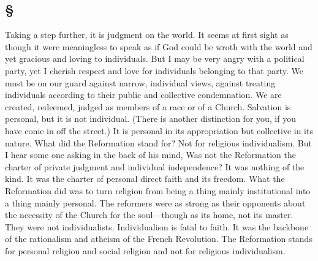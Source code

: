 \documentclass[draft]{ptfdoc}
\begin{document}
\subsection*{
\S
}

Taking a step further, it is judgment on the 
world. It seems at first sight as though it 
were meaningless to speak as if God could be 
wroth with the world and yet gracious and 
loving to individuals. But I may be very angry 
with a political party, yet I cherish respect and 
love for individuals belonging to that party. 
We must be on our guard against narrow, individual 
views, against treating individuals according 
to their public and collective condemnation. 
We are created, redeemed, judged as members 
of a race or of a Church. Salvation is personal, 
but it is not individual. (There is another distinction for you, if you have come in off the 
street.) It is personal in its appropriation but 
collective in its nature. What did the Reformation stand for? Not for religious individualism. 
But I hear some one asking in the back of his 
mind, Was not the Reformation the charter of 
private judgment and individual independence? 
It was nothing of the kind. It was the charter 
of personal direct faith and its freedom. What 
the Reformation did was to turn religion from 
being a thing mainly institutional into a thing 
mainly personal. The reformers were as strong 
as their opponents about the necessity of the 
Church for the soul---though as its home, not its 
master. They were not individualists. Individualism 
is fatal to faith. It was the backbone 
of the rationalism and atheism of the French 
Revolution. The Reformation stands for personal 
religion and social religion and not for 
religious individualism. 
\end{document}
